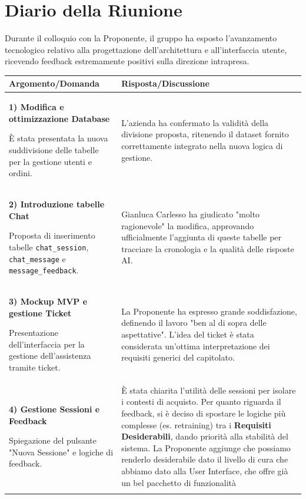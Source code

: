 \documentclass[a4paper, 11pt, oneside]{scrartcl} %
\begin{document}
\newpage
\section{Diario della Riunione}
Durante il colloquio con la Proponente, il gruppo ha esposto l'avanzamento tecnologico relativo alla progettazione dell'architettura e all'interfaccia utente, ricevendo feedback estremamente positivi sulla direzione intrapresa.

\vspace{0.5cm}
\footnotesize
\setlength{\tabcolsep}{5pt}
\begin{tabularx}{\textwidth}{p{} X}
\toprule
\textbf{Argomento/Domanda} & \textbf{Risposta/Discussione} \\
\midrule

\textbf{1) Modifica e ottimizzazione Database} \par
È stata presentata la nuova suddivisione delle tabelle per la gestione utenti e ordini.
&
L'azienda ha confermato la validità della divisione proposta, ritenendo il dataset fornito correttamente integrato nella nuova logica di gestione.
\\ \addlinespace

\textbf{2) Introduzione tabelle Chat} \par
Proposta di inserimento tabelle \texttt{chat\_session}, \texttt{chat\_message} e \texttt{message\_feedback}.
&
Gianluca Carlesso ha giudicato "molto ragionevole" la modifica, approvando ufficialmente l'aggiunta di queste tabelle per tracciare la cronologia e la qualità delle risposte AI.
\\ \addlinespace

\textbf{3) Mockup MVP e gestione Ticket} \par
Presentazione dell'interfaccia per la gestione dell'assistenza tramite ticket.
&
La Proponente ha espresso grande soddisfazione, definendo il lavoro "ben al di sopra delle aspettative". L'idea del ticket è stata considerata un'ottima interpretazione dei requisiti generici del capitolato.
\\ \addlinespace

\textbf{4) Gestione Sessioni e Feedback} \par
Spiegazione del pulsante "Nuova Sessione" e logiche di feedback.
&
È stata chiarita l'utilità delle sessioni per isolare i contesti di acquisto. Per quanto riguarda il feedback, si è deciso di spostare le logiche più complesse (es. retraining) tra i \textbf{Requisiti Desiderabili}, dando priorità alla stabilità del sistema.
La Proponente aggiunge che possiamo renderlo desiderabile dato il livello di cura che abbiamo dato alla User Interface, che offre già un bel pacchetto di funzionalità
\\ \addlinespace


\end{tabularx}
\end{document}

